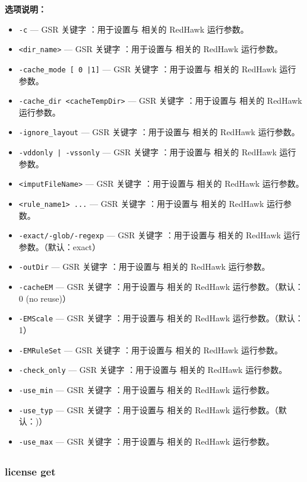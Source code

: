 \textbf{选项说明：}
\begin{itemize}
\item \texttt{-c} — GSR 关键字 ：用于设置与  相关的 RedHawk 运行参数。
\item \texttt{<dir\_name>} — GSR 关键字 ：用于设置与  相关的 RedHawk 运行参数。
\item \texttt{-cache\_mode [ 0 |1]} — GSR 关键字 ：用于设置与  相关的 RedHawk 运行参数。
\item \texttt{-cache\_dir <cacheTempDir>} — GSR 关键字 ：用于设置与  相关的 RedHawk 运行参数。
\item \texttt{-ignore\_layout} — GSR 关键字 ：用于设置与  相关的 RedHawk 运行参数。
\item \texttt{-vddonly | -vssonly} — GSR 关键字 ：用于设置与  相关的 RedHawk 运行参数。
\item \texttt{<imputFileName>} — GSR 关键字 ：用于设置与  相关的 RedHawk 运行参数。
\item \texttt{<rule\_name1> ...} — GSR 关键字 ：用于设置与  相关的 RedHawk 运行参数。
\item \texttt{-exact/-glob/-regexp} — GSR 关键字 ：用于设置与  相关的 RedHawk 运行参数。（默认：exact）
\item \texttt{-outDir} — GSR 关键字 ：用于设置与  相关的 RedHawk 运行参数。
\item \texttt{-cacheEM} — GSR 关键字 ：用于设置与  相关的 RedHawk 运行参数。（默认：0 (no reuse)）
\item \texttt{-EMScale} — GSR 关键字 ：用于设置与  相关的 RedHawk 运行参数。（默认：1）
\item \texttt{-EMRuleSet} — GSR 关键字 ：用于设置与  相关的 RedHawk 运行参数。
\item \texttt{-check\_only} — GSR 关键字 ：用于设置与  相关的 RedHawk 运行参数。
\item \texttt{-use\_min} — GSR 关键字 ：用于设置与  相关的 RedHawk 运行参数。
\item \texttt{-use\_typ} — GSR 关键字 ：用于设置与  相关的 RedHawk 运行参数。（默认：)）
\item \texttt{-use\_max} — GSR 关键字 ：用于设置与  相关的 RedHawk 运行参数。
\end{itemize}

\subsection{}
\subsubsection*{license get}

